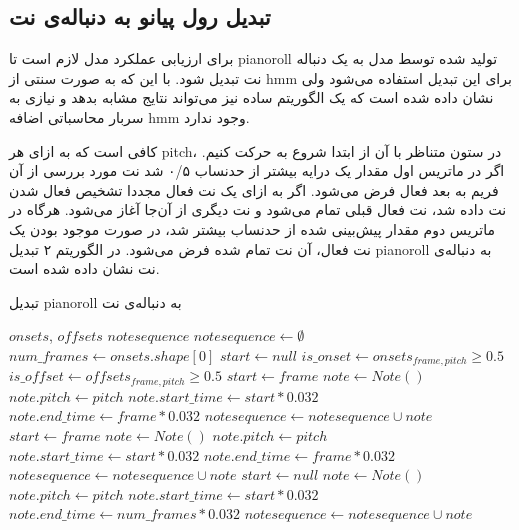 \subsection{تبدیل رول پیانو به دنباله‌ی نت}
برای ارزیابی عملکرد مدل لازم است تا \gls{pianoroll} تولید شده توسط مدل به یک
دنباله نت تبدیل شود. با این که به صورت سنتی از \gls{hmm} برای این تبدیل استفاده
می‌شود ولی نشان داده شده است که یک الگوریتم ساده نیز می‌تواند نتایج مشابه بدهد و
نیازی به سربار محاسباتی اضافه \gls{hmm} وجود ندارد.

کافی است که به ازای هر \gls{pitch}، در ستون متناظر با آن از ابتدا شروع به حرکت
کنیم. اگر در ماتریس اول مقدار یک درایه بیشتر از حدنساب ۰/۵ شد نت مورد بررسی از
آن فریم به بعد فعال فرض می‌شود. اگر به ازای یک نت فعال مجددا تشخیص فعال شدن نت
داده شد، نت فعال قبلی تمام می‌شود و نت دیگری از آن‌جا آغاز می‌شود. هرگاه در
ماتریس دوم مقدار پیش‌بینی شده از حدنساب بیشتر شد، در صورت موجود بودن یک نت فعال،
آن نت تمام شده فرض می‌شود. در الگوریتم ۲ تبدیل \gls{pianoroll} به دنباله‌ی نت
نشان داده شده است.
\begin{algorithm}[ht]
\caption{تبدیل \gls{pianoroll} به دنباله‌ی نت}
\begin{algorithmic}
\begin{latin}
    \Require $onsets$, $offsets$
    \Ensure $notesequence$
    \State $notesequence \leftarrow \emptyset$
    \State $num\_frames \leftarrow onsets.shape[0]$
        \State $start \leftarrow null$
            \State $is\_onset \leftarrow onsets_{frame, pitch} \geq 0.5$
            \State $is\_offset \leftarrow offsets_{frame, pitch} \geq 0.5$
                \State $start \leftarrow frame$
                \State $note \leftarrow Note()$
                \State $note.pitch \leftarrow pitch$
                \State $note.start\_time \leftarrow start * 0.032$
                \State $note.end\_time \leftarrow frame * 0.032$
                \State $notesequence \leftarrow notesequence \cup note$
                \State $start \leftarrow frame$
                \State $note \leftarrow Note()$
                \State $note.pitch \leftarrow pitch$
                \State $note.start\_time \leftarrow start * 0.032$
                \State $note.end\_time \leftarrow frame * 0.032$
                \State $notesequence \leftarrow notesequence \cup note$
                \State $start \leftarrow null$
            \EndIf
        \EndFor
            \State $note \leftarrow Note()$
            \State $note.pitch \leftarrow pitch$
            \State $note.start\_time \leftarrow start * 0.032$
            \State $note.end\_time \leftarrow num\_frames * 0.032$
            \State $notesequence \leftarrow notesequence \cup note$
        \EndIf
    \EndFor
\end{latin}
\end{algorithmic}
\end{algorithm}

